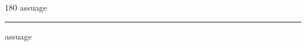 
\begin{frame}
\begin{center}
\begin{turn}{180}
{\fontsize{2.5cm}{1em}\selectfont assuage}
\end{turn}
\vspace{1em}\par  
\hrule
\vspace{1em}\par  
{\fontsize{2.5cm}{1em}\selectfont assuage}
\end{center}
\end{frame}
